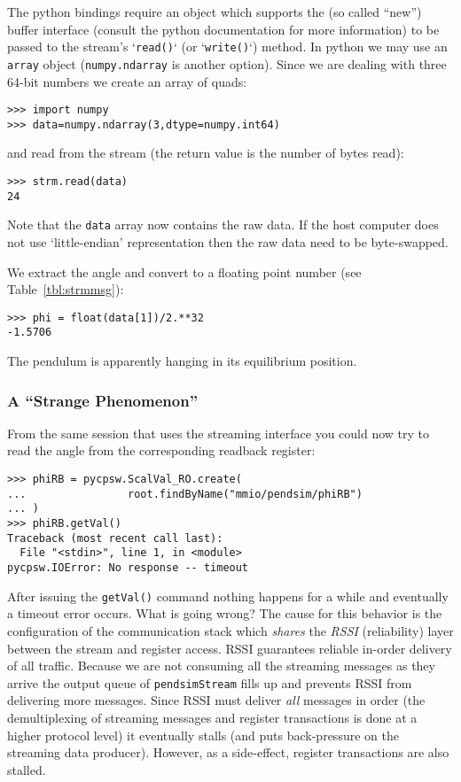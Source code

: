 \documentclass[10pt]{article}
\newcommand{\py}        {python}
\newcommand{\pyt}       {python}
\newcommand{\cod}[1] {{\tt#1}}
\begin{document}
The \py{} bindings require an object which supports the (so called ``new'') buffer
interface (consult the \py{} documentation for more information) to be passed to
the stream's `\cod{read()}` (or `\cod{write()}`) method.
In \pyt{} we may use an \cod{array} object (\cod{numpy.ndarray} is another option).
Since we are dealing with three 64-bit numbers we create an array of quads:
\begin{verbatim}
>>> import numpy
>>> data=numpy.ndarray(3,dtype=numpy.int64)
\end{verbatim}
and read from the stream (the return value is the number of bytes read):
\begin{verbatim}
>>> strm.read(data)
24
\end{verbatim}
Note that the \cod{data} array now contains the raw data. If the host computer does not
use `little-endian' representation then the raw data need to be byte-swapped.

We extract the angle and convert to a floating point number (see
Table~\ref{tbl:strmmsg}):
\begin{verbatim}
>>> phi = float(data[1])/2.**32
-1.5706
\end{verbatim}
The pendulum is apparently hanging in its equilibrium position.

\subsubsection{A ``Strange Phenomenon''}
From the same session that uses the streaming interface you could now try to
read the angle from the corresponding readback register:
\begin{verbatim}
>>> phiRB = pycpsw.ScalVal_RO.create(
...                root.findByName("mmio/pendsim/phiRB")
... )
>>> phiRB.getVal()
Traceback (most recent call last):
  File "<stdin>", line 1, in <module>
pycpsw.IOError: No response -- timeout
\end{verbatim}
After issuing the \cod{getVal()} command nothing happens for a while and eventually
a timeout error occurs. What is going wrong? The cause for this behavior is the
configuration of the communication stack which {\em shares} the {\em RSSI} (reliability) layer
between the stream and register access. RSSI guarantees reliable in-order delivery
of all traffic. Because we are not consuming all the streaming messages as they arrive
the output queue of \cod{pendsimStream} fills up and prevents RSSI from delivering
more messages. Since RSSI must deliver {\em all} messages in order (the demultiplexing
of streaming messages and register transactions is done at a higher protocol level)
it eventually stalls (and puts back-pressure on the streaming data producer).
However, as a side-effect, register transactions are also stalled.
\end{document}
